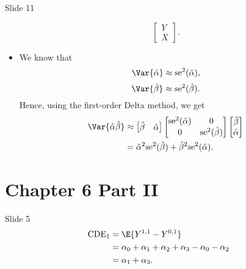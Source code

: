 \begin{Regular}{Slide 11}
\begin{itemize}
\[\begin{bmatrix}
                      Y \\
                      X
                  \end{bmatrix}. \]
        \item We know that
              \[ \Var{\hat{\alpha}}\approx \text{se}^2(\hat{\alpha}), \]
              \[ \Var{\hat{\beta}}\approx \text{se}^2(\hat{\beta}). \]
              Hence, using the first-order Delta method, we get
              \begin{align*}
                  \Var{\hat{\alpha}\hat{\beta}}
                   & \approx \begin{bmatrix}
                                 \hat{\beta} & \hat{\alpha}
                             \end{bmatrix}\begin{bmatrix}
                                              \text{se}^2(\hat{\alpha}) & 0                        \\
                                              0                         & \text{se}^2(\hat{\beta})
                                          \end{bmatrix}\begin{bmatrix}
                                                           \hat{\beta} \\
                                                           \hat{\alpha}
                                                       \end{bmatrix}       \\
                   & =\hat{\alpha}^2\text{se}^2(\hat{\beta})+\hat{\beta}^2\text{se}^2(\hat{\alpha}).
              \end{align*}
    \end{itemize}
\end{Regular}

\section*{Chapter 6 Part II}
\begin{Regular}{Slide 5}
    \begin{align*}
        \text{CDE}_1
         & =\E{Y^{1,1}-Y^{0,1}}                                   \\
         & =\alpha_0+\alpha_1+\alpha_2+\alpha_3-\alpha_0-\alpha_2 \\
         & =\alpha_1+\alpha_3.
    \end{align*}
\end{Regular}

